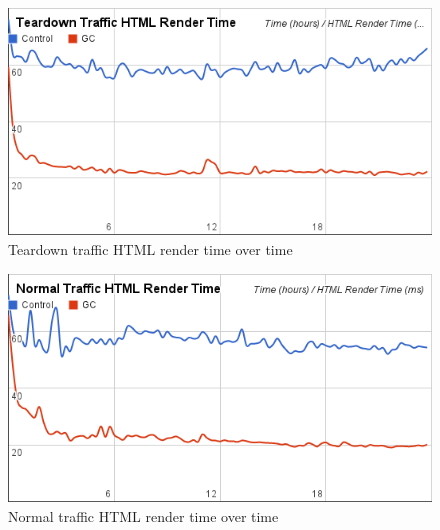 \documentclass[12pt]{ucthesis}
\begin{document}
\begin{figure}[htp]
\centering
\includegraphics[width=\textwidth]{assets/teardownHTMLRenderTimeXTime.png}
\caption{Teardown traffic HTML render time over time}
\label{fig:teardownHTMLRenderTimeXTime}
\end{figure}
\begin{figure}[htp]
\centering
\includegraphics[width=\textwidth]{assets/normalHTMLRenderTimeXTime.png}
\caption{Normal traffic HTML render time over time}
\label{fig:normalHTMLRenderTimeXTime}
\end{figure}
\end{document}
